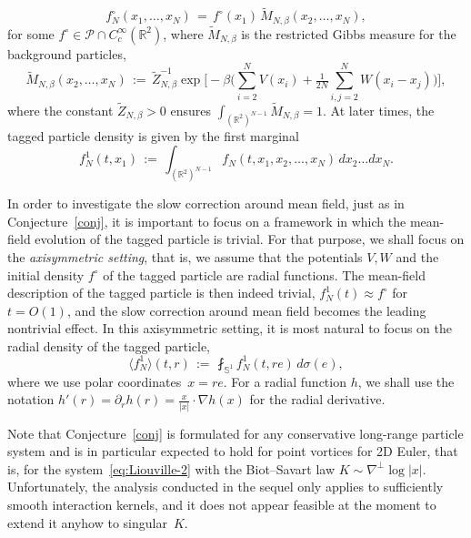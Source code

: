 \documentclass[a4paper,11pt,reqno,noindent]{amsart}
\theoremstyle{plain}
\numberwithin{equation}{section}
\newcommand{\R}{\mathbb R}
\newcommand{\Pc}{\mathcal P}
\newcommand{\Sp}{\mathbb S}
\newcommand{\3}{|\!|\!|}
\begin{document}
\begin{equation}\label{eq:fN0-2}
f_N^\circ(x_1,\ldots,x_N)\,=\,f^{\circ}(x_1)\,\tilde M_{N,\beta}(x_2,\ldots,x_N),
\end{equation}
for some $f^{\circ}\in\Pc\cap C_c^\infty(\R^2)$,
where $\tilde M_{N,\beta}$ is the restricted Gibbs measure for the background particles,
\[\tilde M_{N,\beta}(x_2,\ldots,x_N)\,:=\,\tilde Z_{N,\beta}^{-1}\exp\bigg[-\beta\bigg(\sum_{i=2}^NV(x_i)+\tfrac1{2N}\sum_{i,j=2}^NW(x_i-x_j)\bigg)\bigg],\]
where the constant $\tilde Z_{N,\beta}>0$ ensures $\int_{(\R^2)^{N-1}}\tilde M_{N,\beta}=1$.
At later times, the tagged particle density is given by the first marginal
\[f_N^1(t,x_1)\,:=\,\int_{(\R^2)^{N-1}}f_N(t,x_1,x_2,\ldots,x_N)\,dx_2\ldots dx_N.\]

{In order to investigate the slow correction around mean field, just as in Conjecture~\ref{conj}, it is important to focus on a framework in which the mean-field evolution of the tagged particle is trivial. For that purpose, we shall focus on the {\it axisymmetric setting}, that is, we assume that the potentials $V,W$ and the initial density $f^{\circ}$ of the tagged particle are radial functions. The mean-field description of the tagged particle is then indeed trivial, $f_N^1(t)\approx f^\circ$ for $t=O(1)$, and the slow correction around mean field becomes the leading nontrivial effect.}
In this axisymmetric setting, it is most natural to focus on the radial density of the tagged particle,
\[\langle f_N^1\rangle(t,r)\,:=\,\fint_{\Sp^1}f_N^1(t,re)\,d\sigma(e),\]
where we use polar coordinates~$x=re$.
For a radial function $h$, we shall use the notation $h'(r)=\partial_rh(r)=\tfrac{x}{|x|}\cdot\nabla h(x)$ for the radial derivative.

{Note that Conjecture~\ref{conj} is formulated for any conservative long-range particle system and is in particular expected to hold for point vortices for 2D Euler, that is, for the system~\eqref{eq:Liouville-2} with the Biot--Savart law $K\sim\nabla^\bot \log |x|$. Unfortunately, the analysis conducted in the sequel only applies to sufficiently smooth interaction kernels, and it does not appear feasible at the moment to extend it anyhow to singular~$K$.}
\end{document}
